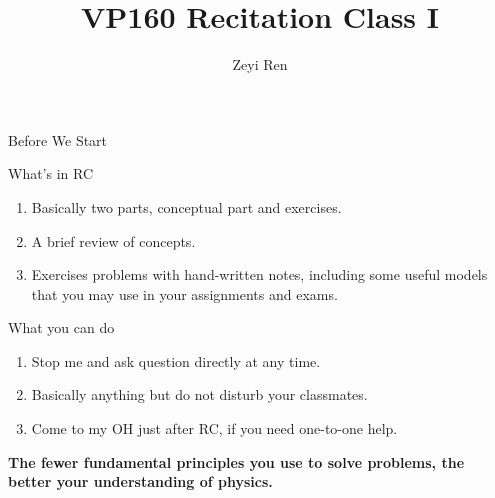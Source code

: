 \documentclass{beamer}
\title{VP160 Recitation Class I}
\author{Zeyi Ren}
\institute{UM-SJTU Joint Institute}
\begin{document}
\maketitle

\frame{\tableofcontents}

\begin{frame}{Before We Start}
  \begin{block}{What's in RC}
    \begin{enumerate}
      \item Basically two parts, conceptual part and exercises.
      \item A brief review of concepts.
      \item Exercises problems with hand-written notes, including some useful models that you may use in your assignments and exams.
    \end{enumerate}
  \end{block}
  \pause
  \begin{block}{What you can do}
    \begin{enumerate}
      \item Stop me and ask question directly at any time.
      \item Basically anything but do not disturb your classmates.
      \item Come to my OH just after RC, if you need one-to-one help.
    \end{enumerate}
  \end{block}
  \pause
  \textbf{The fewer fundamental principles you use to solve problems, the better your understanding of physics.}
\end{frame}
\end{document}
